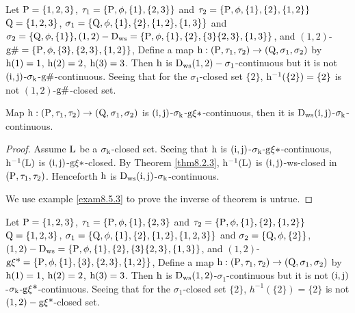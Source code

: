 \begin{exm}\label{exam8.5.2}
Let $\mathrm{P}=\{1, 2, 3\}$, $\tau_1 =\{\mathrm{P}, \phi, \{1\},\{2,3\}\}$ and $\tau_2 =\{\TSP, \phi, \{1\},\{2\},\break \{1, 2\}\}$ $\mathrm{Q}=\{1, 2,3\}$, $\sigma_{1} =\{\mathrm{Q},\phi,\{1\},\{2\},\{1,2\},\{1,3\}\}$ and $\sigma_{2} =\{\mathrm{Q},\phi,\{1\}\},(1,2)-\mathrm{D}_{\mathrm{ws}}=\{\mathrm{P},\phi,\{1\},\{2\},\{3\}\{2,3\},\{1,3\}\}$, and $(1,2)$-$\mathrm{g}\#=\{\mathrm{P}, \phi, \{3\},\{2,3\},\{1,2\}\}$, Define a map $\mathrm{h}: (\mathrm{P}, \tau_1,\tau_2 )\to (\mathrm{Q}, \sigma_{1}, \sigma_{2} )$ by $\mathrm{h}(1)=1$, $\mathrm{h}(2)=2$, $\mathrm{h}(3)=3$. Then $\mathrm{h}$ is $\mathrm{D}_{\mathrm{ws}}(1, 2)-\sigma_{1}$-continuous but it is not $(\mathrm{i},\mathrm{j})$-$\sigma_{\mathrm{k}}$-$\mathrm{g}\#$-continuous. Seeing that for the $\sigma_{1}$-closed set $\{2\}$, $\mathrm{h}^{-1}(\{2\})=\{2\}$ is not $(1, 2)$-$\mathrm{g}\#$-closed set.
\end{exm}

\begin{thm}\label{thm8.5.3}
Map $\mathrm{h}: (\mathrm{P}, \tau_1, \tau_2 )\to (\mathrm{Q}, \sigma_{1}, \sigma_{2} )$ is $(\mathrm{i}, \mathrm{j})$-$\sigma_{\mathrm{k}}$-$\mathrm{g}\xi*$-continuous, then it is $\mathrm{D}_{\mathrm{ws}} (\mathrm{i}, \mathrm{j})$-$\sigma_{\mathrm{k}}$-continuous.
\end{thm}

\begin{proof}
Assume $\mathrm{L}$ be a $\sigma_{\mathrm{k}}$-closed set. Seeing that $\mathrm{h}$ is $(\mathrm{i}, \mathrm{j})$-$\sigma_{\mathrm{k}}$-$\mathrm{g}\xi*$-continuous, $\mathrm{h}^{-1}(\mathrm{L})$ is $(\mathrm{i}, \mathrm{j})$-$\mathrm{g}\xi*$-closed. By Theorem \ref{thm8.2.3}, $\mathrm{h}^{-1}(\mathrm{L})$ is $(\mathrm{i}, \mathrm{j})$-ws-closed in $(\mathrm{P}, \tau_1, \tau_2 )$. Henceforth $\mathrm{h}$ is $\mathrm{D}_{\mathrm{ws}} (\mathrm{i}, \mathrm{j})$-$\sigma_{\mathrm{k}}$-continuous.

We use example \ref{exam8.5.3} to prove the inverse of theorem is untrue.
\end{proof}

\begin{exm}\label{exam8.5.3}
Let $\mathrm{P}=\{1,2,3\}$, $\tau_1 =\{\mathrm{P}, \phi, \{1\},\{2,3\}$ and $\tau_2 =\{\TSP, \phi, \{1\},\{2\},\break \{1,2\}\}$ $\mathrm{Q}=\{1,2,3\}$, $\sigma_{1} =\{\mathrm{Q}, \phi,\{1\},\{2\},\{1,2\},\{1,2,3\}\}$ and $\sigma_{2} =\{\mathrm{Q},\phi,\{2\}\}$, $(1,2)- \mathrm{D}_{\mathrm{ws}} =\{\mathrm{P}, \phi, \{1\},\{2\},\{3\}\{2,3\},\{1,3\}\}$, and $(1,2)$-$\TSg\xi\text{*}=\{ \TSP, \phi, \{1\},\{3\},\break \{2,3\},\{1,2\}\}$, Define a map $\mathrm{h}: (\mathrm{P}, \tau_1, \tau_2 )\to (\mathrm{Q}, \sigma_{1}, \sigma_{2} )$ by $\mathrm{h}(1)=1$, $\mathrm{h}(2)=2$, $\mathrm{h}(3)=3$. Then $\mathrm{h}$ is $\mathrm{D}_{\mathrm{ws}} (1, 2)$-$\sigma_{1}$-continuous but it is not $(\mathrm{i}, \mathrm{j})$-$\sigma_{\mathrm{k}}$-$\mathrm{g}\xi\text{*}$-continuous. Seeing that for the $\sigma_{1}$-closed set $\{2\}$, $h^{-1}(\{2\})=\{2\}$ is not $(1, 2)-\mathrm{g}\xi\text{*}$-closed set.
\end{exm}

